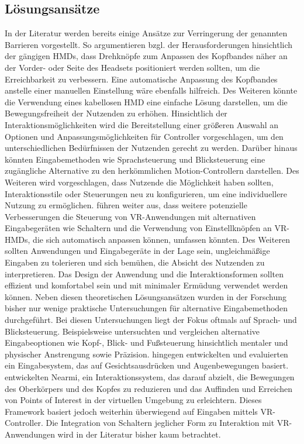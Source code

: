 \subsection{Lösungsansätze}
In der Literatur werden bereits einige Ansätze zur Verringerung der genannten Barrieren vorgestellt. So argumentieren \citet{mott_i_2020} bzgl. der Herausforderungen hinsichtlich der gängigen HMDs, dass Drehknöpfe zum Anpassen des Kopfbandes näher an der Vorder- oder Seite des Headsets positioniert werden sollten, um die Erreichbarkeit zu verbessern. Eine automatische Anpassung des Kopfbandes anstelle einer manuellen Einstellung wäre ebenfalls hilfreich. Des Weiteren könnte die Verwendung eines kabellosen HMD eine einfache Lösung darstellen, um die Bewegungsfreiheit der Nutzenden zu erhöhen. Hinsichtlich der Interaktionsmöglichkeiten wird die Bereitstellung einer größeren Auswahl an Optionen und Anpassungsmöglichkeiten für Controller vorgeschlagen, um den unterschiedlichen Bedürfnissen der Nutzenden gerecht zu werden. Darüber hinaus könnten Eingabemethoden wie Sprachsteuerung und Blicksteuerung eine zugängliche Alternative zu den herkömmlichen Motion-Controllern darstellen. Des Weiteren wird vorgeschlagen, dass Nutzende die Möglichkeit haben sollten, Interaktionsstile oder Steuerungen neu zu konfigurieren, um eine individuellere Nutzung zu ermöglichen. \citet{dombrowski_designing_2019} führen weiter aus, dass weitere potenzielle Verbesserungen die Steuerung von VR-Anwendungen mit alternativen Eingabegeräten wie Schaltern und die Verwendung von Einstellknöpfen an VR-HMDs, die sich automatisch anpassen können, umfassen könnten. Des Weiteren sollten Anwendungen und Eingabegeräte in der Lage sein, ungleichmäßige Eingaben zu tolerieren und sich bemühen, die Absicht des Nutzenden zu interpretieren. Das Design der Anwendung und die Interaktionsformen sollten effizient und komfortabel sein und mit minimaler Ermüdung verwendet werden können. 
Neben diesen theoretischen Lösungsansätzen wurden in der Forschung bisher nur wenige praktische Untersuchungen für alternative Eingabemethoden durchgeführt. Bei diesen Untersuchungen liegt der Fokus oftmals auf Sprach- und Blicksteuerung. Beispielsweise untersuchten und vergleichen \citet{minakata_pointing_2019} alternative Eingabeoptionen wie Kopf-, Blick- und Fußsteuerung hinsichtlich mentaler und physischer Anstrengung sowie Präzision. \citet{wang_intelligent_2018} hingegen entwickelten und evaluierten ein Eingabesystem, das auf Gesichtsausdrücken und Augenbewegungen basiert. \citet{10.1145/3441852.3471230} entwickelten Nearmi, ein Interaktionssystem, das darauf abzielt, die Bewegungen des Oberkörpers und des Kopfes zu reduzieren und das Auffinden und Erreichen von Points of Interest in der virtuellen Umgebung zu erleichtern. Dieses Framework basiert jedoch weiterhin überwiegend auf Eingaben mittels VR-Controller. Die Integration von Schaltern jeglicher Form zu Interaktion mit VR-Anwendungen wird in der Literatur bisher kaum betrachtet.

